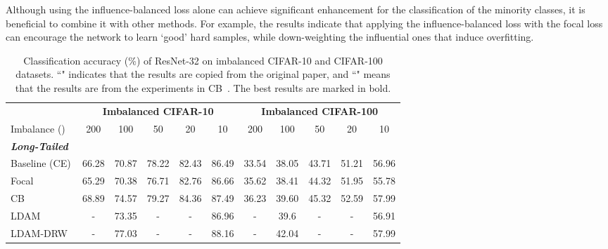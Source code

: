 Although using the influence-balanced loss alone can achieve significant enhancement for the classification of the minority classes, it is beneficial to combine it with other methods. 
For example, the results indicate that applying the influence-balanced loss with the focal loss can encourage the network to learn `good' hard samples, while down-weighting the influential ones that induce overfitting. 

\begin{table*}[t]
\caption{
Classification accuracy (\%) of ResNet-32 on imbalanced CIFAR-10 and CIFAR-100 datasets.
``" indicates that the results are copied from the original paper, 
and ``" means that the results are from the experiments in CB~\cite{ref:cui_belongie_cvpr19}.
The best results are marked in bold.
}
\vspace{0.2cm}
\label{result-table}
\centering
\small
{
\begin{tabular}{
l
ccccc
ccccc
} 
    \toprule
    &  \multicolumn{5}{c}{\textbf{Imbalanced CIFAR-10}}  
    &  \multicolumn{5}{c}{\textbf{Imbalanced CIFAR-100}} 
    \\
    \cmidrule(lr){2-6}\cmidrule(lr){7-11}
    Imbalance ()
    & 200 & 100 & 50 & 20 & 10 
    & 200 & 100 & 50 & 20 & 10 
    \\
    \midrule\midrule
    \textit{\textbf{Long-Tailed}}
    &  &  &  &  & 
    &  &  &  &  & 
    \\
    Baseline (CE)
& 66.28	
        & 70.87	
        & 78.22	
        & 82.43
        & 86.49
& 33.54	
        & 38.05	
        & 43.71	
        & 51.21	
        & 56.96
        \\
        
    Focal~\cite{ref:lin_focal_loss_iccv17}
& 65.29	
        & 70.38 	
        & 76.71 
        & 82.76 
        & 86.66 
& 35.62
        & 38.41 
        & 44.32 
        & 51.95
        & 55.78
        \\
    
    CB ~\cite{ref:cui_belongie_cvpr19}
& 68.89	
        & 74.57	
        & 79.27	
        & 84.36	
        & 87.49
& 36.23	
        & 39.60	
        & 45.32	
        & 52.59	
        & 57.99
        \\
        
    LDAM~\cite{ref:cao_ldam_neurips2019}
& -
        & 73.35
        & -
        & -
        & 86.96
& -
        & 39.6
        & -
        & -
        & 56.91
        \\
    
    LDAM-DRW~\cite{ref:cao_ldam_neurips2019}
& -	
        & 77.03	
        & -	
        & -	
        & 88.16
& -	
        & 42.04	
        & -	
        & -	
        & 57.99
        \\
    

\end{tabular}}
\end{table*}
